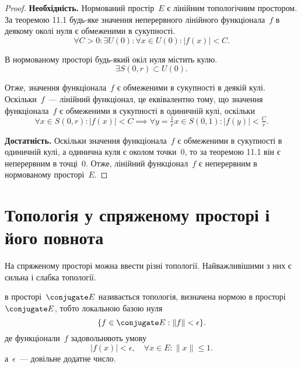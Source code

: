 \begin{proof}
    \textbf{Необхідність.} Нормований простір~$E$ є лінійним топологічним простором. За \error теоремою 11.1 будь-яке значення неперервного лінійного функціонала~$f$ в деякому околі нуля є обмеженими в сукупності.
    \begin{equation*}
        \forall C > 0: \exists U(0): \forall x \in U(0): |f(x)| < C.
    \end{equation*}
    
    В нормованому просторі будь-який окіл нуля містить кулю.
    \begin{equation*}
        \exists S(0, r) \subset U(0).
    \end{equation*}
    
    Отже, значення функціонала~$f$ є обмеженими в сукупності в деякій кулі. Оскільки~$f$~--- лінійний функціонал, це еквівалентно тому, що значення функціонала~$f$ є обмеженими в сукупності в одиничній кулі, оскільки
    \begin{equation*}
        \forall x \in S(0, r): |f(x)| < C \implies
        \forall y = \tfrac{1}{r} x \in S(0, 1): |f(y)| < \tfrac{C}{r}.
    \end{equation*}

    \textbf{Достатність.} Оскільки значення функціонала~$f$ є обмеженими в сукупності в одиничній кулі, а одинична куля є околом точки~$0$, то за теоремою 11.1 він є неперервним в точці~$0$. Отже, лінійний функціонал~$f$ є неперервним в нормованому просторі~$E$. 
\end{proof}

\section{Топологія у спряженому просторі і його повнота}

На спряженому просторі можна ввести різні топології. Найважливішими з них є сильна і слабка топології.

\begin{definition}
     в просторі~$\conjugate E$ називається топологія, визначена нормою в просторі~$\conjugate E$, тобто локальною базою нуля
    \begin{equation*}
        \{f \in \conjugate E: \|f\| < \epsilon\}.
    \end{equation*}
    де функціонали~$f$ задовольняють умову
    \begin{equation*}
        |f(x)| < \epsilon, \quad \forall x \in E: \|x\| \le 1.
    \end{equation*}
    а~$\epsilon$~--- довільне додатне число.
\end{definition}

